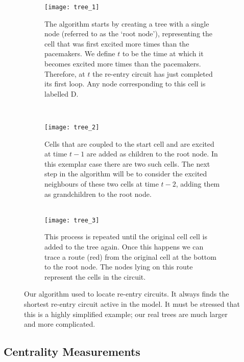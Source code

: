 \begin{figure} \begin{mdframed}
    \centering
    \begin{subfigure}[b]{0.46\textwidth}
        \texttt{[image: tree\_1]}
        \caption{The algorithm starts by creating a tree with a single node (referred to as the `root node'), representing the cell that was first excited more times than the pacemakers. We define $t$ to be the time at which it becomes excited more times than the pacemakers. Therefore, at $t$ the re-entry circuit has just completed its first loop. Any node corresponding to this cell is labelled D. \\}
    \end{subfigure}
    ~
    \begin{subfigure}[b]{0.46\textwidth}
        \texttt{[image: tree\_2]}
        \caption{Cells that are coupled to the start cell and are excited at time $t-1$ are added as children to the root node. In this exemplar case there are two such cells. The next step in the algorithm will be to consider the excited neighbours of these two cells at time $t - 2$, adding them as grandchildren to the root node. \\ \\}
    \end{subfigure}
    
    \begin{subfigure}[b]{0.92\textwidth}
        \texttt{[image: tree\_3]}
        \caption{This process is repeated until the original cell cell is added to the tree again. Once this happens we can trace a route (red) from the original cell at the bottom to the root node. The nodes lying on this route represent the cells in the circuit.}
    \end{subfigure}
    \caption{Our algorithm used to locate re-entry circuits. It always finds the shortest re-entry circuit active in the model. It must be stressed that this is a highly simplified example; our real trees are much larger and more complicated.}
    \label{fig:reentryalgo}
\end{mdframed} \end{figure}

\subsection{Centrality Measurements} \label{sec:centrality}

